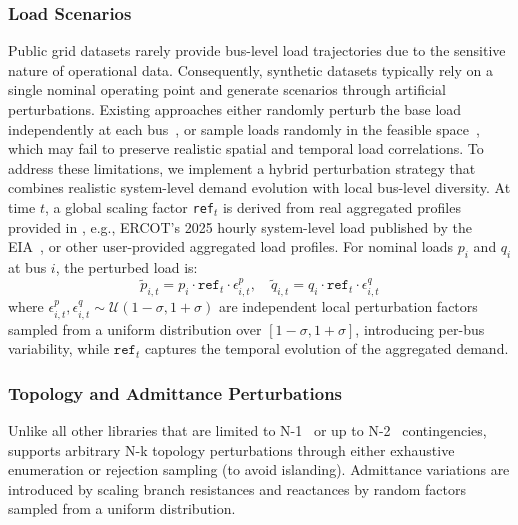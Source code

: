 \subsubsection{Load Scenarios}
Public grid datasets rarely provide bus-level load trajectories due to the sensitive nature of operational data. Consequently, synthetic datasets typically rely on a single nominal operating point and generate scenarios through artificial perturbations. Existing approaches either randomly perturb the base load independently at each bus~\cite{lin2024powerflownet, piloto2024, lovett2024opfdatalargescaledatasetsac}, or sample loads randomly in the feasible space~\cite{NEURIPS2025_d000ef56,opflearn}, which may fail to preserve realistic spatial and temporal load correlations. To address these limitations, we implement a hybrid perturbation strategy that combines realistic system-level demand evolution with local bus-level diversity. At time $t$, a global scaling factor \texttt{ref}$_t$ is derived from real aggregated profiles provided in \datakit, e.g., ERCOT's 2025 hourly system-level load published by the EIA~\cite{EIA_ERCOT_2025}, or other user-provided aggregated load profiles. For nominal loads $p_i$ and $q_i$ at bus $i$, the perturbed load is:
\begin{equation}
\label{eq:scaling}
    \tilde{p}_{i,t} = p_i \cdot \texttt{ref}_t \cdot \epsilon^p_{i,t}, \quad \tilde{q}_{i,t} = q_i \cdot \texttt{ref}_t \cdot \epsilon^q_{i,t}
\end{equation}
where $\epsilon^p_{i,t}, \epsilon^q_{i,t} \sim \mathcal{U}(1 - \sigma, 1 + \sigma)$ are independent local perturbation factors sampled from a uniform distribution over $[1-\sigma,1+\sigma]$, introducing per-bus variability, while $\texttt{ref}_t$ captures the temporal evolution of the aggregated demand.

\subsubsection{Topology and Admittance Perturbations}
Unlike all other libraries that are limited to N-1~\cite{lin2024powerflownet, lovett2024opfdatalargescaledatasetsac, piloto2024, opflearn, pglearn, varbella2024powergraph} or up to N-2~\cite{NEURIPS2025_d000ef56} contingencies, \datakit supports arbitrary N-k topology perturbations through either exhaustive enumeration or rejection sampling (to avoid islanding). Admittance variations are introduced by scaling branch resistances and reactances by random factors sampled from a uniform distribution.

